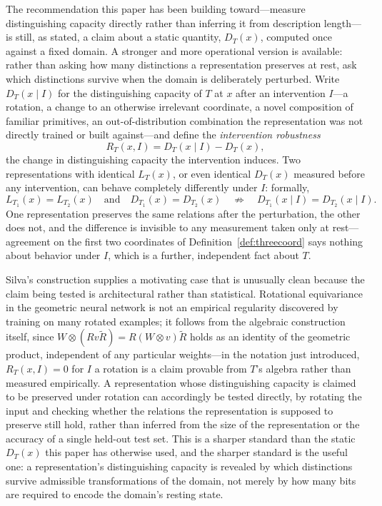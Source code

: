 \documentclass[11pt]{article}
\theoremstyle{plain}
\begin{document}
The recommendation this paper has been building toward---measure distinguishing capacity directly rather than inferring it from description length---is still, as stated, a claim about a static quantity, $D_T(x)$, computed once against a fixed domain. A stronger and more operational version is available: rather than asking how many distinctions a representation preserves at rest, ask which distinctions survive when the domain is deliberately perturbed. Write $D_T(x \mid I)$ for the distinguishing capacity of $T$ at $x$ after an intervention $I$---a rotation, a change to an otherwise irrelevant coordinate, a novel composition of familiar primitives, an out-of-distribution combination the representation was not directly trained or built against---and define the \emph{intervention robustness}
\[
R_T(x, I) = D_T(x \mid I) - D_T(x),
\]
the change in distinguishing capacity the intervention induces. Two representations with identical $L_T(x)$, or even identical $D_T(x)$ measured before any intervention, can behave completely differently under $I$: formally,
\[
L_{T_1}(x) = L_{T_2}(x) \quad \text{and} \quad D_{T_1}(x) = D_{T_2}(x) \quad \not\Rightarrow \quad D_{T_1}(x \mid I) = D_{T_2}(x \mid I).
\]
One representation preserves the same relations after the perturbation, the other does not, and the difference is invisible to any measurement taken only at rest---agreement on the first two coordinates of Definition~\ref{def:threecoord} says nothing about behavior under $I$, which is a further, independent fact about $T$.

Silva's construction supplies a motivating case that is unusually clean because the claim being tested is architectural rather than statistical. Rotational equivariance in the geometric neural network is not an empirical regularity discovered by training on many rotated examples; it follows from the algebraic construction itself, since $W \otimes (R v \tilde R) = R(W \otimes v)\tilde R$ holds as an identity of the geometric product, independent of any particular weights---in the notation just introduced, $R_T(x, I) = 0$ for $I$ a rotation is a claim provable from $T$'s algebra rather than measured empirically. A representation whose distinguishing capacity is claimed to be preserved under rotation can accordingly be tested directly, by rotating the input and checking whether the relations the representation is supposed to preserve still hold, rather than inferred from the size of the representation or the accuracy of a single held-out test set. This is a sharper standard than the static $D_T(x)$ this paper has otherwise used, and the sharper standard is the useful one: a representation's distinguishing capacity is revealed by which distinctions survive admissible transformations of the domain, not merely by how many bits are required to encode the domain's resting state.
\end{document}

